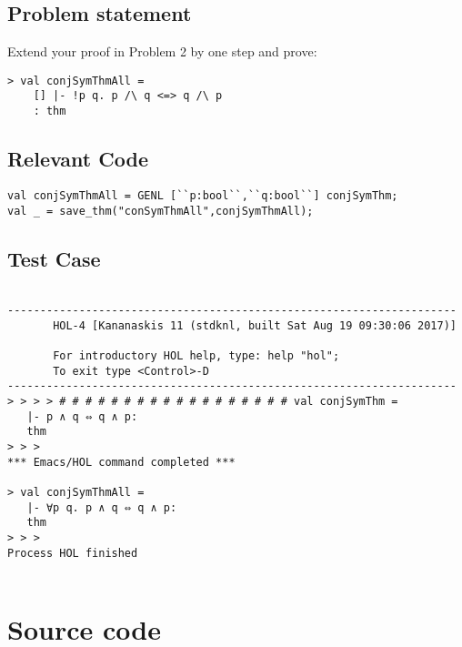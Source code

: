 \documentclass{report}
\begin{document}
\section{Problem statement}
\label{problem-statement-8-4-3}
Extend your proof in Problem 2 by one step and prove:
\begin{lstlisting}[frame=tblr]
> val conjSymThmAll =
	[] |- !p q. p /\ q <=> q /\ p
	: thm
\end{lstlisting}
\section{Relevant Code}
\label{rel-code-8-4-3}
\begin{lstlisting}[frame=TBlr]
val conjSymThmAll = GENL [``p:bool``,``q:bool``] conjSymThm;
val _ = save_thm("conSymThmAll",conjSymThmAll);
\end{lstlisting}

\section{Test Case}
\label{trans-8-4-3}
\begin{session}
  \begin{scriptsize}
\begin{verbatim}

---------------------------------------------------------------------
       HOL-4 [Kananaskis 11 (stdknl, built Sat Aug 19 09:30:06 2017)]

       For introductory HOL help, type: help "hol";
       To exit type <Control>-D
---------------------------------------------------------------------
> > > > # # # # # # # # # # # # # # # # # # val conjSymThm =
   |- p ∧ q ⇔ q ∧ p:
   thm
> > > 
*** Emacs/HOL command completed ***

> val conjSymThmAll =
   |- ∀p q. p ∧ q ⇔ q ∧ p:
   thm
> > > 
Process HOL finished


\end{verbatim}
  \end{scriptsize}
\end{session}


\appendix{}

\chapter{Source code}
\label{cha:source-code}


\end{document}
